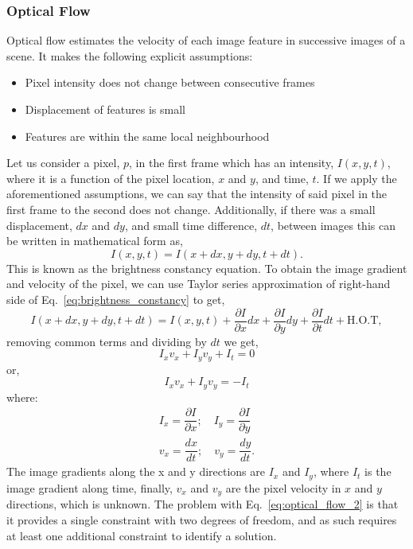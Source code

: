 \subsubsection{Optical Flow}

Optical flow estimates the velocity of each image feature in successive images
of a scene. It makes the following explicit assumptions:

\begin{itemize}
  \setlength{\itemsep}{1pt}
  \setlength{\parskip}{0pt}
  \setlength{\parsep}{0pt}

  \item{Pixel intensity does not change between consecutive frames}
  \item{Displacement of features is small}
  \item{Features are within the same local neighbourhood}
\end{itemize}

Let us consider a pixel, $p$, in the first frame which has an intensity, $I(x,
y, t)$, where it is a function of the pixel location, $x$ and $y$, and time,
$t$. If we apply the aforementioned assumptions, we can say that the intensity
of said pixel in the first frame to the second does not change. Additionally,
if there was a small displacement, $dx$ and $dy$, and small time difference,
$dt$, between images this can be written in mathematical form as,
%
\begin{equation}
  \label{eq:brightness_constancy}
  I(x, y, t) = I(x + dx, y + dy, t + dt).
\end{equation}
%
This is known as the brightness constancy equation. To obtain the image
gradient and velocity of the pixel, we can use Taylor series approximation of
right-hand side of Eq.~\eqref{eq:brightness_constancy} to get,
%
\begin{equation}
  I(x + dx, y + dy, t + dt) = I(x, y, t)
    + \dfrac{\partial{I}}{\partial{x}} dx
    + \dfrac{\partial{I}}{\partial{y}} dy
    + \dfrac{\partial{I}}{\partial{t}} dt
    + \text{H.O.T},
\end{equation}
%
removing common terms and dividing by $dt$ we get,
%
\begin{equation}
  \label{eq:optical_flow}
  I_{x} v_{x} + I_{y} v_y + I_{t} = 0
\end{equation}
or,
%
\begin{equation}
  \label{eq:optical_flow_2}
  I_{x} v_{x} + I_{y} v_y = -I_{t}
\end{equation}
%
where:
%
\begin{align}
  I_{x} = \dfrac{\partial I}{\partial x}
  ; \quad
  I_{y} = \dfrac{\partial I}{\partial y} \nonumber \\
  v_{x} = \dfrac{dx}{dt}
  ; \quad
  v_y = \dfrac{dy}{dt}. \nonumber
\end{align}
%
The image gradients along the x and y directions are $I_{x}$ and $I_{y}$, where
$I_{t}$ is the image gradient along time, finally, $v_{x}$ and $v_{y}$ are the
pixel velocity in $x$ and $y$ directions, which is unknown. The problem with
Eq.~\ref{eq:optical_flow_2} is that it provides a single constraint with two
degrees of freedom, and as such requires at least one additional constraint to
identify a solution.

